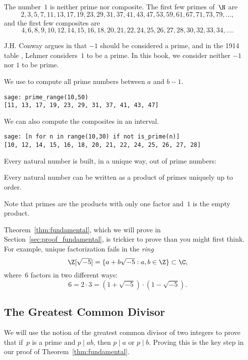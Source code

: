 The number~$1$ is neither prime nor composite.  The first few
primes of~$\N$ are $$
2,3,5,7,11, 13, 17, 19, 23, 29, 31, 37, 41, 43,
47, 53, 59, 61, 67, 71, 73, 79, \ldots, $$
and the first few
composites are $$
4,6,8,9,10,12, 14, 15, 16, 18, 20, 21, 22, 24, 25,
26, 27, 28, 30, 32, 33, 34, \ldots.  $$

\begin{remark}
  J.\thinspace{}H. Conway argues in \cite[viii]{conway:sensual} that
  $-1$ should be considered a prime, and in the 1914 table
  \cite{lehmer:primetable}, Lehmer considers~$1$ to be a prime.
In this book, we consider neither $-1$ nor $1$ to be prime.
\end{remark}

\begin{sg}
We use \sage to compute all prime numbers between $a$ and $b-1$.
\begin{verbatim}
sage: prime_range(10,50)
[11, 13, 17, 19, 23, 29, 31, 37, 41, 43, 47]
\end{verbatim}
\noindent{}We can also compute the composites in an interval.
\begin{verbatim}
sage: [n for n in range(10,30) if not is_prime(n)]
[10, 12, 14, 15, 16, 18, 20, 21, 22, 24, 25, 26, 27, 28]
\end{verbatim}
\end{sg}

\noindent{}Every natural number is built, in a unique way, out of prime numbers:
\begin{theorem}\label{thm:fundamental}%
%
%
%
Every natural number can be written as a product of primes
uniquely up to order.
\end{theorem}
Note that primes are the products with only one factor and~$1$ is the
empty product.

\begin{remark}
Theorem~\ref{thm:fundamental}, which we will prove in
Section~\ref{sec:proof_fundamental}, is trickier to prove than you
might first think.  For example, unique factorization fails in the {\em ring}
$$
 \Z[\sqrt{-5}] = \{a + b\sqrt{-5} : a, b\in\Z\} \subset \C,
$$
where~$6$ factors in two different ways:
$$
 6 = 2\cdot 3 = (1+\sqrt{-5})\cdot (1-\sqrt{-5}).
$$
\end{remark}

\subsection{The Greatest Common Divisor}
We will use the notion of the greatest common divisor of two integers to
prove that if~$p$ is a prime and $p\mid ab$, then $p\mid a$ or $p\mid
b$.  Proving this is the key step in our proof of
Theorem~\ref{thm:fundamental}.

